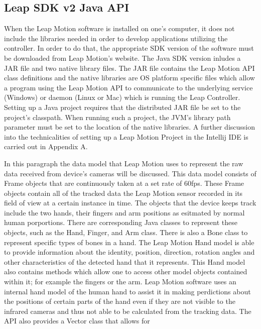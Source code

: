 	
\subsection{Leap SDK v2 Java API}
When the Leap Motion software is installed on one's computer, it does not include the libraries needed in order to develop applications utilizing the controller. In order to do that, the appropriate SDK version of the software must be downloaded from Leap Motion's website. The Java SDK version inludes a JAR file and two native library files. The JAR file contains the Leap Motion API class definitions and the native libraries are OS platform specific files which allow a program using the Leap Motion API to communicate to the underlying service (Windows) or daemon (Linux or Mac) which is running the Leap Controller. Setting up a Java project requires that the distributed JAR file be set to the project's classpath. When running such a project, the JVM's library path parameter must be set to the location of the native libraries. A further discussion into the technicalities of setting up a Leap Motion Project in the Intellij IDE is carried out in Appendix A.


In this paragraph the data model that Leap Motion uses to represent the raw data received from device's cameras will be discussed. This data model consists of Frame objects that are continuously taken at a set rate of 60fps. These Frame objects contain all of the tracked data the Leap Motion sensor recorded in its field of view at a certain instance in time. The objects that the device keeps track include the two hands, their fingers and arm positions as esitmated by normal human porportions. There are corresponding Java classes to represent these objects, such as the Hand, Finger, and Arm class. There is also a Bone class to represent specific types of bones in a hand. The Leap Motion Hand model is able to provide information about the identity, position, direction, rotation angles and other characteristics of the detected hand that it represents. This Hand model also contains methods which allow one to access other model objects contained within it; for example the fingers or the arm. Leap Motion software uses an internal hand model of the human hand to assist it in making perdictions about the positions of certain parts of the hand even if they are not visible to the infrared cameras and thus not able to be calculated from the tracking data. The API also provides a Vector class that allows for 

